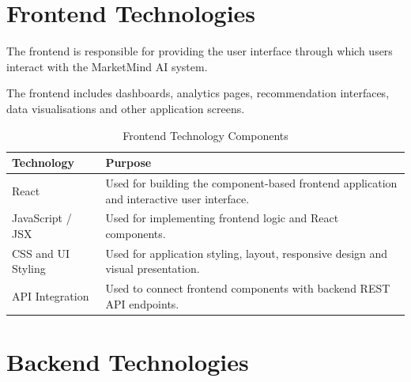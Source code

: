 \documentclass[12pt,a4paper]{report}
\begin{document}

\section{Frontend Technologies}

The frontend is responsible for providing the user interface through
which users interact with the MarketMind AI system.

The frontend includes dashboards, analytics pages, recommendation
interfaces, data visualisations and other application screens.

\begin{table}[H]
\centering

\caption{Frontend Technology Components}

\begin{tabular}{p{4cm} p{9cm}}

\toprule

\textbf{Technology} &
\textbf{Purpose}

\\

\midrule

React &
Used for building the component-based frontend application and
interactive user interface.

\\[6pt]

JavaScript / JSX &
Used for implementing frontend logic and React components.

\\[6pt]

CSS and UI Styling &
Used for application styling, layout, responsive design and visual
presentation.

\\[6pt]

API Integration &
Used to connect frontend components with backend REST API endpoints.

\\

\bottomrule

\end{tabular}

\end{table}



\section{Backend Technologies}
\end{document}
